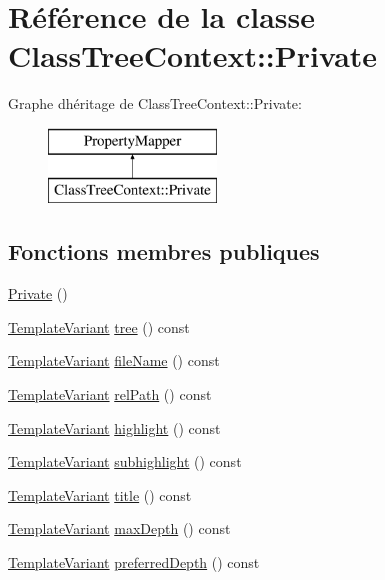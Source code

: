 \hypertarget{class_class_tree_context_1_1_private}{}\section{Référence de la classe Class\+Tree\+Context\+:\+:Private}
\label{class_class_tree_context_1_1_private}
Graphe d\textquotesingle{}héritage de Class\+Tree\+Context\+:\+:Private\+:\begin{figure}[H]
\begin{center}
\leavevmode
\includegraphics[height=2.000000cm]{class_class_tree_context_1_1_private}
\end{center}
\end{figure}
\subsection*{Fonctions membres publiques}
\begin{DoxyCompactItemize}
\item 
\hyperlink{class_class_tree_context_1_1_private_a6f3e5cfeca06da694dbcb610a8235019}{Private} ()
\item 
\hyperlink{class_template_variant}{Template\+Variant} \hyperlink{class_class_tree_context_1_1_private_a1d6868bd3fa5b3e2bb6d2e518cc823e7}{tree} () const 
\item 
\hyperlink{class_template_variant}{Template\+Variant} \hyperlink{class_class_tree_context_1_1_private_ad4cb281f4eb1732fca1a9449e664d0db}{file\+Name} () const 
\item 
\hyperlink{class_template_variant}{Template\+Variant} \hyperlink{class_class_tree_context_1_1_private_a9f737a2b70708473f89dbe090ee46a98}{rel\+Path} () const 
\item 
\hyperlink{class_template_variant}{Template\+Variant} \hyperlink{class_class_tree_context_1_1_private_a249aa55a4f03e2d3600f2e38d5da858b}{highlight} () const 
\item 
\hyperlink{class_template_variant}{Template\+Variant} \hyperlink{class_class_tree_context_1_1_private_ac159056ce800f08cb31d45245fb66297}{subhighlight} () const 
\item 
\hyperlink{class_template_variant}{Template\+Variant} \hyperlink{class_class_tree_context_1_1_private_a01468117c568a21b658bf29530c17412}{title} () const 
\item 
\hyperlink{class_template_variant}{Template\+Variant} \hyperlink{class_class_tree_context_1_1_private_aba94d6afd9f3faefe485192fc513c8ff}{max\+Depth} () const 
\item 
\hyperlink{class_template_variant}{Template\+Variant} \hyperlink{class_class_tree_context_1_1_private_ae7ec68c3456f1d8006f4409e4699e286}{preferred\+Depth} () const 
\end{DoxyCompactItemize}


